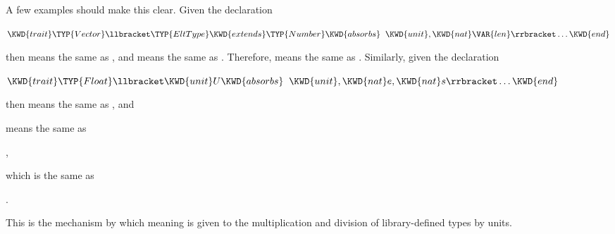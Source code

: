 A few examples should make this clear.  Given the declaration
\begin{Fortress}
\(\KWD{trait} \TYP{Vector}\llbracket\TYP{EltType} \KWD{extends} \TYP{Number} \KWD{absorbs}\;\;\KWD{unit}, \KWD{nat} \VAR{len}\rrbracket \ldots \KWD{end}\)
\end{Fortress}
then 
means the same as
,
and  means the same as
.
Therefore,
means the same as
.
%
Similarly, given the declaration
\begin{Fortress}
\(\KWD{trait} \TYP{Float}\llbracket\KWD{unit} U \KWD{absorbs}\;\;\KWD{unit}, \KWD{nat} e, \KWD{nat} s\rrbracket \ldots \KWD{end}\)
\end{Fortress}
then  means the same as
, and
\begin{Fortress}
\end{Fortress}
means the same as
\begin{Fortress}
,
\end{Fortress}
which is the same as
\begin{Fortress}
.
\end{Fortress}
This is the mechanism by which meaning is given to the multiplication
and division of library-defined types by units.
